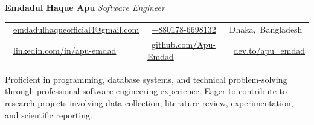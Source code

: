 \documentclass[a4paper]{article}
\newcommand{\icon}[1]{\BeginAccSupp{method=escape,ActualText={}}#1\EndAccSupp{}}
\newcommand{\bodyfont}{%
  \fontsize{11pt}{13pt}\selectfont
}
\begin{document}
\bodyfont


{\fontsize{16pt}{19.2pt}\selectfont\bfseries
  Emdadul Haque Apu}
\hspace{6pt}
{\fontsize{13pt}{15.6pt}\selectfont\itshape
  Software Engineer}

\par\vspace{11pt}

\begin{tabular*}{\textwidth}{@{\extracolsep{\fill}}lll}
  \mbox{\icon{\faEnvelope}\hspace{6pt}
    \href{mailto:emdadulhaqueofficial4@gmail.com}
    {emdadulhaqueofficial4@gmail.com}}
  &
  \mbox{\icon{\faPhone}\hspace{6pt}
    \href{tel:+8801786698132}
    {+880178-6698132}}
  &
  \mbox{\icon{\faMapMarker*}\hspace{6pt}Dhaka, Bangladesh}
  \\
  [9pt]
  \mbox{\icon{\faLinkedin}\hspace{6pt}
    \href{https://linkedin.com/in/apu-emdad}
    {linkedin.com/in/apu-emdad}}
  &
  \mbox{\icon{\faGithub}\hspace{6pt}
    \href{https://github.com/Apu-Emdad}
    {github.com/Apu-Emdad}}
  &
  \mbox{\icon{\faDev}\hspace{6pt}
    \href{https://dev.to/apu_emdad}
    {dev.to/apu\_emdad}}
\end{tabular*}

\par\vspace{16pt}


Proficient in programming, database systems, and technical problem-solving through professional software engineering experience. Eager to contribute to research projects involving data collection, literature review, experimentation, and scientific reporting.\par

\end{document}
